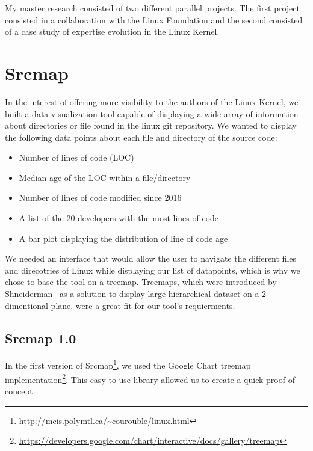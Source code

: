 \label{sec:Theme1}



My master research consisted of two different parallel projects. The first project consisted in a collaboration with the Linux Foundation and the second consisted of a case study of expertise evolution in the Linux Kernel.



\section{Srcmap}

In the interest of offering more visibility to the authors of the Linux Kernel, we built a data visualization tool capable of displaying a wide array of information about directories or file found in the linux git repository. We wanted to display the following data points about each file and directory of the source code:

\begin{itemize}
	\item Number of lines of code (LOC)
	\item Median age of the LOC within a file/directory
	\item Number of lines of code modified since 2016
	\item A list of the 20 developers with the most lines of code
	\item A bar plot displaying the distribution of line of code age
\end{itemize}

We needed an interface that would allow the user to navigate the different files and direcotries of Linux while displaying our list of datapoints, which is why we chose to base the tool on a treemap. Treemaps, which were introduced by Shneiderman~\citep{Bederson-2002} as a solution to display large hierarchical dataset on a 2 dimentional plane, were a great fit for our tool's requierments. 

\subsection{Srcmap 1.0}

In the first version of Srcmap\footnote{\url{http://mcis.polymtl.ca/~courouble/linux.html}}, we used the Google Chart treemap implementation\footnote{\url{https://developers.google.com/chart/interactive/docs/gallery/treemap}}. This easy to use library allowed us to create a quick proof of concept. 

